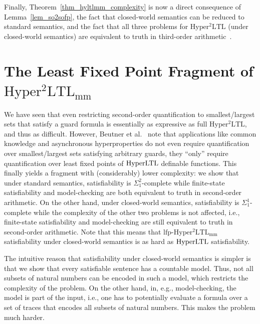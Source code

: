 \documentclass[dvipsnames,10pt,a4paper]{amsart}
\theoremstyle{definition}
\theoremstyle{remark}
\newcommand{\hyltl}{\mathrm{Hyper\-LTL}\xspace}
\newcommand{\sohyltl}{\mathrm{Hyper^2LTL}\xspace}
\newcommand{\sohyltlfp}{\mathrm{Hyper^2LTL_{\mathrm{mm}}}\xspace}
\newcommand{\lfpsohyltlfp}{\mathrm{lfp\text{-}{Hyper^2LTL_{\mathrm{mm}}}}\xspace}
\newcommand{\myquot}[1]{``#1''}
\begin{document}
Finally, Theorem~\ref{thm_hyltlmm_complexity} is now a direct consequence of Lemma~\ref{lem_so2sofp}, the fact that closed-world semantics can be reduced to standard semantics, and the fact that all three problems for $\sohyltl$ (under closed-world semantics) are equivalent to truth in third-order arithmetic~\cite{sohypercomplexity}.


\section{\texorpdfstring{The Least Fixed Point Fragment of $\sohyltlfp$}{Second-order HyperLTL with Least Fixed Points}}
\label{sec_lfp}

We have seen that even restricting second-order quantification to smallest/largest sets that satisfy a guard formula is essentially as expressive as full $\sohyltl$, and thus as difficult.
However, Beutner et al.~\cite{DBLP:conf/cav/BeutnerFFM23} note that applications like common knowledge and asynchronous hyperproperties do not even require quantification over smallest/largest sets satisfying arbitrary guards, they \myquot{only} require quantification over least fixed points of $\hyltl$ definable functions.
This finally yields a fragment with (considerably) lower complexity: 
we show that under standard semantics, satisfiability is $\Sigma_1^2$-complete while finite-state satisfiability and model-checking are both equivalent to truth in second-order arithmetic.
On the other hand, under closed-world semantics, satisfiability is $\Sigma_1^1$-complete while the complexity of the other two problems is not affected, i.e., finite-state satisfiability and model-checking are still equivalent to truth in second-order arithmetic.
Note that this means that $\lfpsohyltlfp$ satisfiability under closed-world semantics is as hard as  $\hyltl$ satisfiability.

The intuitive reason that satisfiability under closed-world semantics is simpler is that we show that every satisfiable sentence has a countable model. 
Thus, not all subsets of natural numbers can be encoded in such a model, which restricts the complexity of the problem.
On the other hand, in, e.g., model-checking, the model is part of the input, i.e., one has to potentially evaluate a formula over a set of traces that encodes all subsets of natural numbers. 
This makes the problem much harder. 
\end{document}
